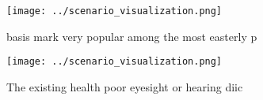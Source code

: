 \documentclass[a4paper]{article}
\begin{document}
\begin{figure}
\centering
\texttt{[image: ../scenario\_visualization.png]}
\caption{basis mark very popular among the most easterly p
}
\end{figure}
 
\begin{figure}
\centering
\texttt{[image: ../scenario\_visualization.png]}
\caption{The existing health poor eyesight or hearing diic
}
\end{figure}
 
\end{document}
